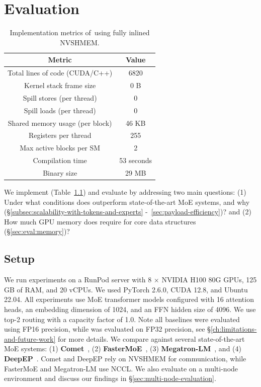 \chapter{Evaluation}\label{ch:evaluation}
\begin{table}[h]
    \centering
    \caption{Implementation metrics of~\sysname using fully inlined NVSHMEM.}
    \label{tab:impl_metrics}
    \begin{tabular}{cc}
        \toprule
        \textbf{Metric} & \textbf{Value}\\ \hline
        Total lines of code (CUDA/C++) & 6820 \\
        Kernel stack frame size & 0 B \\
        Spill stores (per thread) & 0 \\
        Spill loads (per thread) & 0 \\
        Shared memory usage (per block) & 46 KB \\
        Registers per thread & 255 \\
        Max active blocks per SM & 2 \\
        Compilation time & 53 seconds \\
        Binary size & 29 MB\\
    \end{tabular}
\end{table}
We implement (Table~\ref{tab:impl_metrics}) and evaluate \sysname by addressing two main questions:
(1) Under what conditions does \sysname outperform state-of-the-art MoE systems,
and why (\S\ref{subsec:scalability-with-tokens-and-experts} -~\ref{sec:payload-efficiency})? and (2) How much GPU memory does
\sysname require for core data structures (\S\ref{sec:eval:memory})?
\section{Setup}\label{sec:setup}
We run experiments on a RunPod server with 8 $\times$ NVIDIA H100 80G GPUs, 125 GB of RAM, and 20 vCPUs.
We used PyTorch 2.6.0, CUDA 12.8, and Ubuntu 22.04.
All experiments use MoE transformer models configured with 16 attention heads,
an embedding dimension of 1024, and an FFN hidden size of 4096.
We use top-2 routing with a capacity factor of 1.0.
Note all baselines were evaluated using FP16 precision, while \sysname was evaluated on FP32 precision,
see \S\ref{ch:limitations-and-future-work} for more details.
We compare \sysname against several state-of-the-art MoE systems:
(1) \textbf{Comet}~\cite{comet},
(2) \textbf{FasterMoE}~\cite{fastermoe},
(3) \textbf{Megatron-LM}~\cite{megatron-lm}, and
(4) \textbf{DeepEP}~\cite{deepep}.
Comet and DeepEP rely on NVSHMEM for communication, while FasterMoE and Megatron-LM use NCCL.
We also evaluate \sysname on a multi-node environment and discuss our findings in \S\ref{sec:multi-node-evaluation}.
